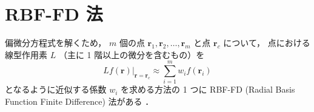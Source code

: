 %

\section{RBF-FD 法}\label{sec:interp_kernel_rbf-fd}

偏微分方程式を解くため，
$m$ 個の点 $\bm{r}_1, \bm{r}_2, \ldots, \bm{r}_m$ と点 $\bm{r}_c$ について，
点における線型作用素 $L$ （主に 1 階以上の微分を含むもの）を
\begin{equation}
    L f(\bm{r}) |_{\bm{r} = \bm{r}_c} \approx \sum_{i=1}^m w_i f(\bm{r}_i)
    \label{eq:rbf_rbf-fd_approximation-formula}
\end{equation}
となるように近似する係数 $w_i$ を求める方法の 1 つに
RBF-FD (Radial Basis Function Finite Difference) 法がある
\cite{Fornberg2015}．

